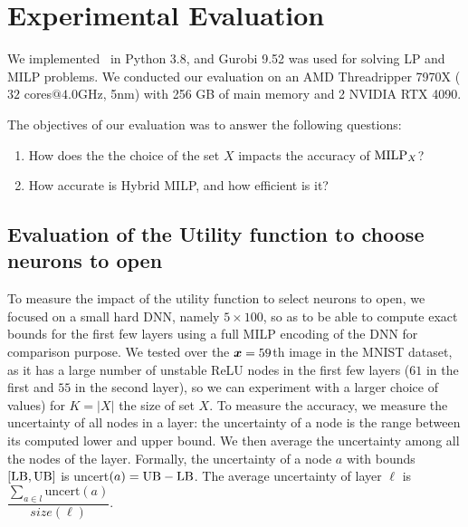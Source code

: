 \section{Experimental Evaluation}

%
We implemented \toolname\ in Python 3.8, and Gurobi 9.52 was used for solving LP and MILP problems. We conducted our evaluation on an AMD Threadripper 7970X  ($32$ cores$@4.0$GHz, 5nm) with 256 GB of main memory and 2 NVIDIA RTX 4090.

The  objectives of our evaluation was to answer the following  questions:

\begin{enumerate}
	\item How does the the choice of the set $X$ impacts the accuracy of ${\textrm{MILP}}_X$? 
	\item How accurate is Hybrid MILP, and how efficient is it?
\end{enumerate}


\subsection{Evaluation of the Utility function to choose neurons to open}

To measure the impact of the utility function to select neurons to open, we focused on a small hard DNN, namely $5\times 100$, so as to be able to compute exact bounds for the first few layers using a full MILP encoding of the DNN for comparison purpose. We tested over the ${\bm{x}}=59$th image in the MNIST dataset, as it has a large number of unstable ReLU nodes in the first few layers ($61$ in the first and $55$ in the second layer), so we can experiment with a larger choice of values) for $K=|X|$ the size of set $X$.
To measure the accuracy, we measure the uncertainty of all nodes in a layer:
the uncertainty of a node is the range between its computed lower and upper bound. 
We then average the uncertainty among all the nodes of the layer.
Formally, the uncertainty of a node $a$ with bounds $[\mathrm{LB},\mathrm{UB}]$ is uncert$(a) = \mathrm{UB} - \mathrm{LB}$. The average uncertainty of layer $\ell$ is $\dfrac{\sum_{a\in l} \text{uncert}(a)}{size(\ell)}.$







